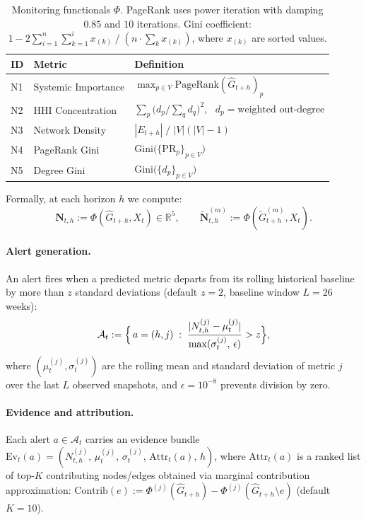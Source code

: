 \begin{table}[!t]
\centering
\footnotesize
\setlength{\tabcolsep}{4pt}
\begin{tabularx}{\textwidth}{@{}llX@{}}
\toprule
ID & Metric & Definition \\
\midrule
N1 & Systemic Importance & $\max_{p\in V} \mathrm{PageRank}(\widehat{G}_{t+h})_p$ \\
N2 & HHI Concentration & $\sum_p \bigl(d_p / \textstyle\sum_q d_q\bigr)^2$, \ $d_p = \text{weighted out-degree}$ \\
N3 & Network Density & $|E_{t+h}| \;/\; |V|(|V|-1)$ \\
N4 & PageRank Gini & $\mathrm{Gini}\!\bigl(\{\mathrm{PR}_p\}_{p\in V}\bigr)$ \\
N5 & Degree Gini & $\mathrm{Gini}\!\bigl(\{d_p\}_{p\in V}\bigr)$ \\
\bottomrule
\end{tabularx}
\caption{Monitoring functionals $\Phi$. PageRank uses power iteration with damping $0.85$ and $10$ iterations. Gini coefficient: $1 - 2\sum_{i=1}^{n}\sum_{k=1}^{i}x_{(k)} \;/\; (n \cdot \sum_k x_{(k)})$, where $x_{(k)}$ are sorted values.}
\label{tab:metrics}
\end{table}

\noindent Formally, at each horizon $h$ we compute:
\begin{equation}
\label{eq:monitor_metrics}
\mathbf{N}_{t,h} := \Phi(\widehat{G}_{t+h},X_t)\in\mathbb{R}^5,\qquad
\widetilde{\mathbf{N}}^{(m)}_{t,h} := \Phi(\widetilde{G}^{(m)}_{t+h},X_t).
\end{equation}

\paragraph{Alert generation.}
An alert fires when a predicted metric departs from its rolling historical baseline by more than $z$ standard deviations (default $z=2$, baseline window $L=26$ weeks):
\begin{equation}
\label{eq:alert_trigger}
\mathcal{A}_t :=
\Bigl\{\, a=(h,j)\;:\; \frac{|N_{t,h}^{(j)} - \mu_t^{(j)}|}{\max(\sigma_t^{(j)},\,\epsilon)} > z \Bigr\},
\end{equation}
where $(\mu_t^{(j)},\sigma_t^{(j)})$ are the rolling mean and standard deviation of metric $j$ over the last $L$ observed snapshots, and $\epsilon=10^{-8}$ prevents division by zero.

\paragraph{Evidence and attribution.}
Each alert $a\in\mathcal{A}_t$ carries an evidence bundle $\mathrm{Ev}_t(a) = ( N_{t,h}^{(j)},\, \mu_t^{(j)},\, \sigma_t^{(j)},\, \mathrm{Attr}_t(a),\, h )$, where $\mathrm{Attr}_t(a)$ is a ranked list of top-$K$ contributing nodes/edges obtained via marginal contribution approximation: $\mathrm{Contrib}(e) := \Phi^{(j)}(\widehat{G}_{t+h}) - \Phi^{(j)}(\widehat{G}_{t+h}\setminus e)$ (default $K=10$).

